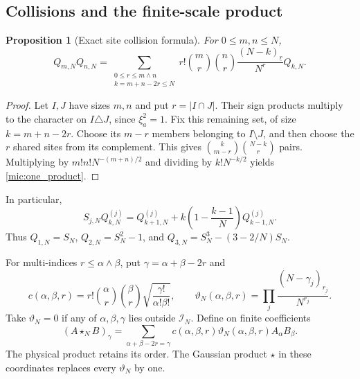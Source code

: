 \documentclass[11pt,a4paper]{amsart}
\numberwithin{equation}{section}
\newtheorem{proposition}[theorem]{Proposition}
\theoremstyle{definition}
\theoremstyle{remark}
\begin{document}
\subsection{Collisions and the finite-scale product}
\begin{proposition}[Exact site collision formula]\label{mic:collision}
For $0\le m,n\le N$,
\begin{equation}\label{mic:one_product}
 Q_{m,N}Q_{n,N}
 =\sum_{\substack{0\le r\le m\wedge n\\k=m+n-2r\le N}}
 r!\binom mr\binom nr\frac{(N-k)_{\underline r}}{N^r}Q_{k,N}.
\end{equation}
\end{proposition}
\begin{proof}
Let $I,J$ have sizes $m,n$ and put $r=|I\cap J|$. Their sign products multiply to the character on $I\triangle J$, since $\xi_a^2=1$. Fix this remaining set, of size $k=m+n-2r$. Choose its $m-r$ members belonging to $I\setminus J$, and then choose the $r$ shared sites from its complement. This gives
$\binom{k}{m-r}\binom{N-k}{r}$ pairs. Multiplying by $m!n!N^{-(m+n)/2}$ and dividing by $k!N^{-k/2}$ yields \eqref{mic:one_product}.
\end{proof}
In particular,
\begin{equation}\label{mic:recurrence}
 S_{j,N}Q_{k,N}^{(j)}
 =Q_{k+1,N}^{(j)}+k\left(1-\frac{k-1}{N}\right)Q_{k-1,N}^{(j)}.
\end{equation}
Thus $Q_{1,N}=S_N$, $Q_{2,N}=S_N^2-1$, and
$Q_{3,N}=S_N^3-(3-2/N)S_N$.

For multi-indices $r\le\alpha\wedge\beta$, put $\gamma=\alpha+\beta-2r$ and
\begin{equation}\label{mic:collision_weights}
 c(\alpha,\beta,r)=r!\binom\alpha r\binom\beta r
       \sqrt{\frac{\gamma!}{\alpha!\beta!}},\qquad
 \vartheta_N(\alpha,\beta,r)
       =\prod_j\frac{(N-\gamma_j)_{\underline{r_j}}}{N^{r_j}}.
\end{equation}
Take $\vartheta_N=0$ if any of $\alpha,\beta,\gamma$ lies outside $\mathcal I_N$. Define on finite coefficients
\begin{equation}\label{mic:product}
 (A\star_NB)_\gamma
 =\sum_{\alpha+\beta-2r=\gamma}
 c(\alpha,\beta,r)\vartheta_N(\alpha,\beta,r)A_\alpha B_\beta.
\end{equation}
The physical product retains its order. The Gaussian product $\star$ in these coordinates replaces every $\vartheta_N$ by one.
\end{document}
